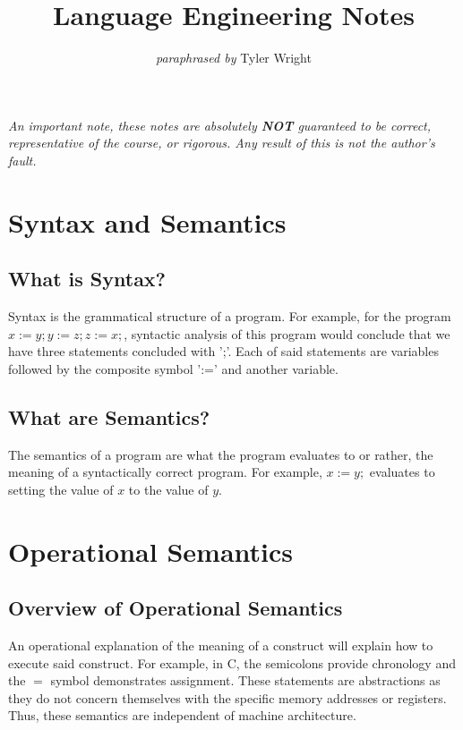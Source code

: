 \documentclass[a4paper, 12pt, twoside]{article}
\begin{document}
\title{Language Engineering Notes}
\date{}
\author{\textit{paraphrased by} Tyler Wright}
\maketitle

\vfill

\textit{An important note, these notes are absolutely \textbf{NOT}
  guaranteed to be correct, representative of the course, or rigorous.
  Any result of this is not the author's fault.}

\newpage

\section{Syntax and Semantics}

\subsection{What is Syntax?}

Syntax is the grammatical structure of a program. For example,
for the program $x:=y;y:=z;z:=x;$, syntactic analysis of this 
program would conclude that we have three statements concluded
with ';'. Each of said statements are variables followed by
the composite symbol ':=' and another variable.

\subsection{What are Semantics?}

The semantics of a program are what the program evaluates
to or rather, the meaning of a syntactically correct program.
For example, $x:=y;$ evaluates to setting the value of $x$ to the 
value of $y$.

\section{Operational Semantics}

\subsection{Overview of Operational Semantics}

An operational explanation of the meaning of a construct will explain
how to execute said construct. For example, in C, the semicolons provide
chronology and the $=$ symbol demonstrates assignment. These statements
are abstractions as they do not concern themselves with the specific
memory addresses or registers. Thus, these semantics are independent
of machine architecture.
\end{document}
